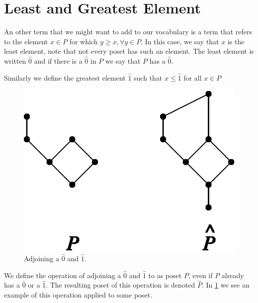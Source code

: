 \section{Least and Greatest Element}
\label{tree:poset:leastandgreatest}

An other term that we might want to add to our vocabulary is a term that refers
to the element $x \in P$ for which $y \geq x, \forall y \in P$. In this case,
we say that $x$ is the least element, note that not every poset has such an
element. The least element is written $\hat{0}$ and if there is a $\hat{0}$ in
$P$ we say that $P$ has a $\hat{0}$.

Similarly we define the greatest element $\hat{1}$ such that $x \leq \hat{1}$
for all $x \in P$

\begin{figure}
	\centering
	\includegraphics[height=0.2\textheight]{fig/stanley/3-3}
	\caption{\label{fig:stanley:3-3} Adjoining a $\hat{0}$ and $\hat{1}$.
\cite{Stanley:2011:ECV:2124415}}
\end{figure}

We define the operation of adjoining a $\hat{0}$ and $\hat{1}$ to as poset $P$,
even if $P$ already has a $\hat{0}$ or a $\hat{1}$. The resulting poset of this
operation is denoted $\hat{P}$. In \ref{fig:stanley:3-3} we see an example of
this operation applied to some poset.



